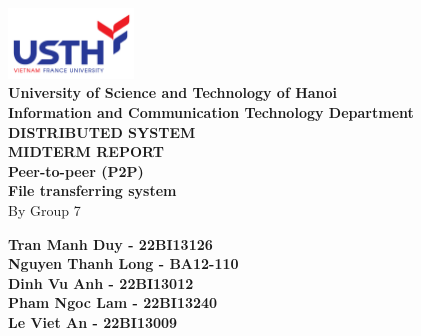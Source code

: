 \documentclass[a4paper,12pt]{article}
\begin{document}
\begin{titlepage}
\centering
\includegraphics[width=0.25\textwidth]{3.Logo USTH.png}\\[1cm]
\textbf{\large University of Science and Technology of Hanoi}\\
\textbf{\large Information and Communication Technology Department}\\[2cm]

{\LARGE \textbf{DISTRIBUTED SYSTEM}}\\[0.5cm]
{\LARGE \textbf{MIDTERM REPORT}}\\[1.5cm]

{\Huge \textbf{Peer-to-peer (P2P)}}\\
{\Huge \textbf{File transferring system}}\\[2cm]

{\Large By Group 7}\\[1cm]

\begin{center}
    \textbf{Tran Manh Duy - 22BI13126}\\
    \textbf{Nguyen Thanh Long - BA12-110}\\
    \textbf{Dinh Vu Anh - 22BI13012}\\
    \textbf{Pham Ngoc Lam - 22BI13240}\\
    \textbf{Le Viet An - 22BI13009}\\[1cm]
\end{center}

\vfill

\end{titlepage}

\tableofcontents
\newpage






\end{document}
